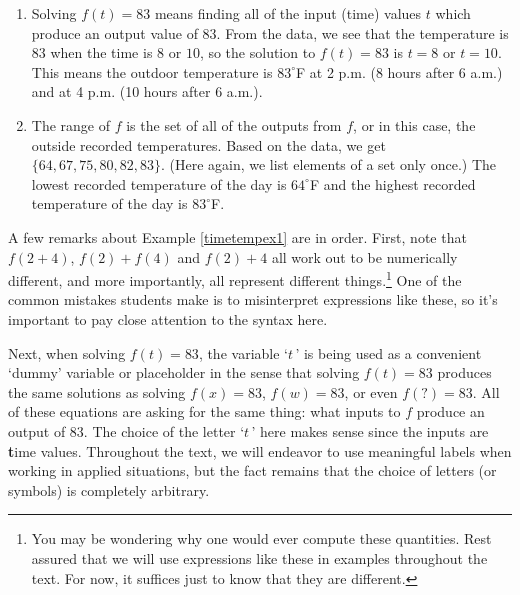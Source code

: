 \documentclass{ximera}
\begin{document}
\begin{example}
\begin{explanation}
\begin{enumerate}
\begin{itemize}
\end{itemize}

\item  Solving $f(t) = 83$ means finding all of the input (time) values $t$  which produce an output value of $83$.  From the data, we see that the temperature is $83$ when the time is $8$ or $10$, so the solution to $f(t) = 83$ is $t = 8$ or $t = 10$.  This means the outdoor temperature is $83^{\circ}$F at 2 p.m. (8 hours after 6 a.m.) and at 4 p.m. (10 hours after 6 a.m.).

\item  The range of $f$ is the set of all of the outputs from $f$, or in this case, the outside recorded temperatures.  Based on the data, we get $\{ 64, 67, 75, 80, 82, 83\}$.  (Here again, we list elements of a set only once.)  The lowest recorded temperature of the day is  $64^{\circ}$F and the highest recorded temperature of the day is  $83^{\circ}$F.  

\end{enumerate}


\end{explanation}


\end{example}


A few remarks about Example \ref{timetempex1} are in order.  First, note that $f(2+4)$, $f(2)+f(4)$ and $f(2)+4$ all work out to be numerically different, and more importantly, all represent different things.\footnote{You may be wondering why one would ever compute these quantities.  Rest assured that we will use expressions like these in examples throughout the text.  For now, it suffices just to know that they are different.}  One of the common mistakes students make is to misinterpret expressions like these, so it's important to pay close attention to the syntax here.



Next,  when solving $f(t) = 83$, the variable `$t\,$' is being used as a convenient `dummy' variable or placeholder in the sense that solving $f(t) = 83$ produces the same solutions as solving $f(x) = 83$, $f(w) = 83$,  or even $f(?) = 83$.  All of these equations are asking for the same thing:  what inputs to $f$ produce an output of $83$.  The choice of the letter `$t\,$' here makes sense since the inputs are {\bf t}ime values.  Throughout the text, we will endeavor to use meaningful labels when working in applied situations, but the fact remains that the choice of letters (or symbols) is completely arbitrary. 
\end{document}
